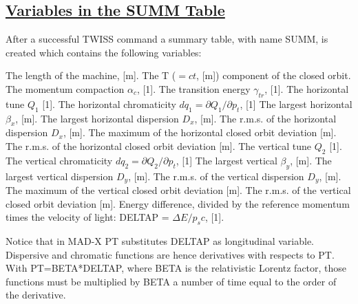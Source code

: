 \subsection{\href{summ}{Variables in the SUMM Table}} 
\label{subsec:tables_summ}
After a successful TWISS command a summary table, with name SUMM, is created which
contains the following variables:  
\begin{madlist}
   The length of the machine, [m].     
   The T ($= c t$, [m]) component of the closed orbit.     
   The momentum compaction $\alpha_c$, [1].     
   The transition energy $\gamma_{tr}$, [1].     
   The horizontal tune $Q_1$ [1].     
   The horizontal chromaticity $dq_1 = \partial Q_1 / \partial p_t$, [1]
   The largest horizontal $\beta_x$, [m].     
   The largest horizontal dispersion $D_x$, [m].     
   The r.m.s. of the horizontal dispersion $D_x$, [m].     
   The maximum of the horizontal closed orbit deviation [m].     
   The r.m.s. of the horizontal closed orbit deviation [m].     
   The vertical tune $Q_2$ [1].     
   The vertical chromaticity $dq_2 = \partial Q_2 / \partial p_t$, [1]
   The largest vertical $\beta_y$, [m].     
   The largest vertical dispersion $D_y$, [m].     
   The r.m.s. of the vertical dispersion $D_y$, [m].     
   The maximum of the vertical closed orbit deviation [m].     
   The r.m.s. of the vertical closed orbit deviation [m].     
   Energy difference, divided by the reference
  momentum times the velocity of light: DELTAP = $\Delta E / p_s c$, [1].
\end{madlist} 

Notice that in MAD-X PT substitutes DELTAP as longitudinal
variable. Dispersive and chromatic functions are hence derivatives with
respects to PT. With PT=BETA*DELTAP, where BETA is the relativistic
Lorentz factor, those functions must be multiplied by BETA a number of
time equal to the order of the derivative.  

